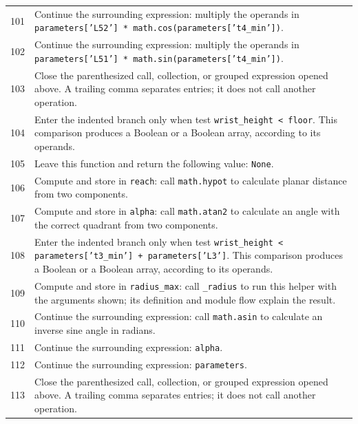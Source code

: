 \documentclass[11pt,a4paper]{book}
\begin{document}
\begin{longtable}{r p{}}
101 & Continue the surrounding expression: multiply the operands in \texttt{parameters['L52'] * math.cos(parameters['t4\_min'])}. \\

102 & Continue the surrounding expression: multiply the operands in \texttt{parameters['L51'] * math.sin(parameters['t4\_min'])}. \\

103 & Close the parenthesized call, collection, or grouped expression opened above. A trailing comma separates entries; it does not call another operation. \\

104 & Enter the indented branch only when test \texttt{wrist\_height < floor}. This comparison produces a Boolean or a Boolean array, according to its operands. \\

105 & Leave this function and return the following value: \texttt{None}. \\

106 & Compute and store in \texttt{reach}: call \texttt{math.hypot} to calculate planar distance from two components.  \\

107 & Compute and store in \texttt{alpha}: call \texttt{math.atan2} to calculate an angle with the correct quadrant from two components.  \\

108 & Enter the indented branch only when test \texttt{wrist\_height < parameters['t3\_min'] + parameters['L3']}. This comparison produces a Boolean or a Boolean array, according to its operands. \\

109 & Compute and store in \texttt{radius\_max}: call \texttt{\_radius} to run this helper with the arguments shown; its definition and module flow explain the result.  \\

110 & Continue the surrounding expression: call \texttt{math.asin} to calculate an inverse sine angle in radians. \\

111 & Continue the surrounding expression: \texttt{alpha}. \\

112 & Continue the surrounding expression: \texttt{parameters}. \\

113 & Close the parenthesized call, collection, or grouped expression opened above. A trailing comma separates entries; it does not call another operation. \\


\end{longtable}
\end{document}
